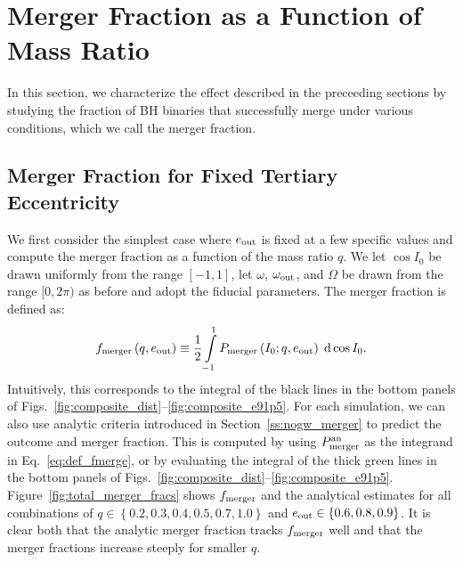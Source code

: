 \documentclass[
        fleqn,
        usenatbib,
    ]{mnras}
\newcommand*{\p}[1]{\left(#1\right)}
\newcommand*{\z}[1]{\left\{#1\right\}}
\begin{document}
\section{Merger Fraction as a Function of Mass Ratio}\label{s:merger_frac}

In this section, we characterize the effect described in the preceeding sections
by studying the fraction of BH binaries that successfully merge under various
conditions, which we call the merger fraction.

\subsection{Merger Fraction for Fixed Tertiary Eccentricity}

We first consider the simplest case where $e_{\rm out}$ is fixed at a few
specific values and compute the merger fraction as a function of the mass ratio
$q$. We let $\cos I_0$ be drawn uniformly from the range $[-1, 1]$, let
$\omega$, $\omega_{\rm out}$, and $\Omega$ be drawn from the range $[0,
2\pi)$ as before %
and adopt the fiducial parameters. The merger fraction is defined as:
\begin{equation}
    f_{\rm merger}\p{q, e_{\rm out}} \equiv
        \frac{1}{2}\int\limits_{-1}^1P_{\rm merger}\p{I_0; q, e_{\rm out}}
            \;\mathrm{d}\cos I_0.\label{eq:def_fmerge}
\end{equation}
Intuitively, this corresponds to the integral of the black lines in the bottom
panels of Figs.~\ref{fig:composite_dist}--\ref{fig:composite_e91p5}. For each
simulation, we can also use analytic criteria introduced in
Section~\ref{ss:nogw_merger} to predict the outcome and merger fraction. This is
computed by using $P_{\rm merger}^{\rm an}$ as the integrand in
Eq.~\eqref{eq:def_fmerge}, or by evaluating the integral of the thick green
lines in the bottom panels of
Figs.~\ref{fig:composite_dist}--\ref{fig:composite_e91p5}.
Figure~\ref{fig:total_merger_fracs} shows $f_{\rm merger}$ and the analytical
estimates for all combinations
of $q \in \z{0.2, 0.3, 0.4, 0.5, 0.7, 1.0}$ and $e_{\rm out} \in \z{0.6, 0.8,
0.9}$. It is clear both that the analytic merger fraction tracks $f_{\rm
merger}$ well and that the merger fractions increase steeply for smaller $q$.
\end{document}
